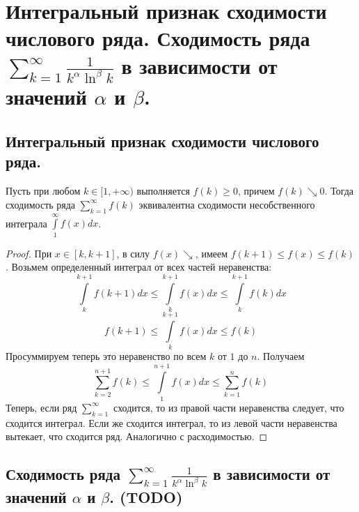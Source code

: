 \section{Интегральный признак сходимости числового ряда. Сходимость ряда $\sum_{k=1}^{\infty} \frac{1}{k^\alpha \ln^{\beta} k}$ в зависимости от значений $\alpha$ и $\beta$.}

\subsection{Интегральный признак сходимости числового ряда.}
\begin{theorem}
    Пусть при любом $k \in [1, +\infty)$ выполняется $f(k) \geqslant 0$, причем $f(k) \searrow 0$. Тогда сходимость ряда $\sum_{k=1}^{\infty} f(k)$ эквивалентна сходимости несобственного интеграла $\int \limits_{1}^{\infty} f(x) dx$.
    \begin{proof}
        При $x \in [k, k + 1]$, в силу $f(x) \searrow$, имеем $f(k + 1) \leqslant f(x) \leqslant f(k)$. Возьмем определенный интеграл от всех частей неравенства:
        \[
            \int \limits_k^{k+1} f(k+1) dx
            \leqslant
            \int \limits_{k}^{k+1} f(x) dx
            \leqslant
            \int \limits_{k}^{k+1} f(k) dx
        \]
        \[
            f(k+1)
            \leqslant
            \int \limits_{k}^{k+1} f(x) dx
            \leqslant
            f(k)
        \]
        Просуммируем теперь это неравенство по всем $k$ от $1$ до $n$. Получаем
        \[
            \sum_{k=2}^{n + 1} f(k)
            \leqslant
            \int \limits_1^{n+1} f(x) dx
            \leqslant
            \sum_{k=1}^{n} f(k)
        \]
        Теперь, если ряд $\sum_{k=1}^{\infty}$ сходится, то из правой части неравенства следует, что сходится интеграл. Если же сходится интеграл, то из левой части неравенства вытекает, что сходится ряд. Аналогично с расходимостью.
    \end{proof}
\end{theorem}

\subsection{Сходимость ряда $\sum_{k=1}^{\infty} \frac{1}{k^\alpha \ln^{\beta} k}$ в зависимости от значений $\alpha$ и $\beta$. (TODO)}